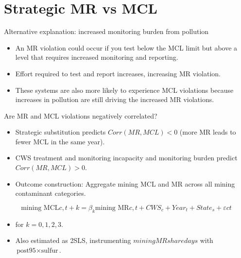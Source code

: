 \documentclass{beamer}
\begin{document}
\begin{frame}{}

\end{frame}

\begin{frame}{}

\end{frame}

\begin{frame}{}

\end{frame}

\begin{frame}{}

\end{frame}

\section{Strategic MR vs MCL}



\begin{frame}{Alternative explanation: increased monitoring burden from pollution}
\begin{itemize}
    \item An MR violation could occur if you test below the MCL limit but above a level that requires increased monitoring and reporting. 
    \item Effort required to test and report increases, increasing MR violation.
    \item These systems are also more likely to experience MCL violations because increases in pollution are still driving the increased MR violations.
\end{itemize}
\end{frame}

\begin{frame}{Are MR and MCL violations negatively correlated?}

\begin{itemize}
\item Strategic substitution predicts $Corr(MR, MCL) < 0$ (more MR leads to fewer MCL in the same year).
\item CWS treatment and monitoring incapacity and monitoring burden predict $Corr(MR, MCL) > 0$. 
\item Outcome construction: Aggregate mining MCL and MR across all mining contaminant categories.
\end{itemize}

$$\text{mining MCL}{c,t+k} = \beta_k \text{mining MR}{c,t} + CWS_c + Year_t + State_s + \varepsilon{ct}$$
 
\begin{itemize}
    \item for $k = 0, 1, 2, 3$. 
    \item Also estimated as 2SLS, instrumenting $mining MR share days$ with $\text{post95} \times \text{sulfur}$.
\end{itemize}
\end{frame}
\end{document}
